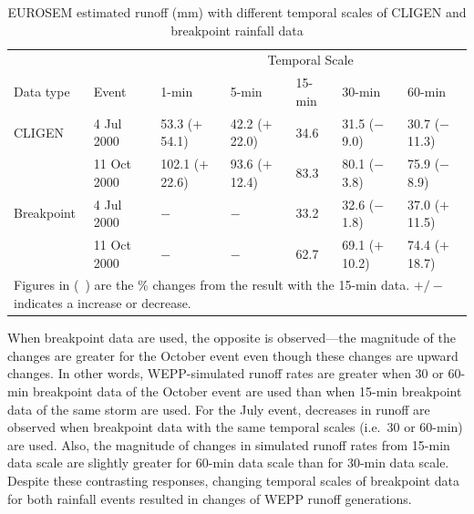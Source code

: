 \begin{table}[htbp]
  \centering
  \footnotesize
  \caption[EUROSEM estimated runoff (mm) with different temporal scales of
CLIGEN and breakpoint rainfall data]{EUROSEM estimated runoff (mm) with
different temporal scales of CLIGEN and breakpoint rainfall data}
\label{tab:DifferentTemporalScalesOfRainfallDataOnEUROSEMRunoffEstimation}
    \begin{tabular}{lllllll}
      \toprule
      & & \multicolumn{5}{c}{Temporal Scale}\\
      \cmidrule{3-7}
      Data type & Event & 1-min & 5-min & 15-min & 30-min & 60-min \\
      \midrule
      CLIGEN & 4 Jul 2000 & 53.3 ($+$54.1) & 42.2 ($+$22.0) & 34.6 & 31.5
($-$9.0) & 30.7 ($-$11.3) \\
       & 11 Oct 2000 & 102.1 ($+$22.6) & 93.6 ($+$12.4) & 83.3 & 80.1 ($-$3.8) &
75.9 ($-$8.9) \\
       \midrule
      Breakpoint & 4 Jul 2000 & $-$ & $-$ & 33.2 & 32.6 ($-$1.8) & 37.0
($+$11.5) \\
       & 11 Oct 2000 & $-$ & $-$ & 62.7 & 69.1 ($+$10.2) & 74.4 ($+$18.7)\\
      \bottomrule
      \multicolumn{7}{p{12cm}}{\footnotesize Figures in (\ ) are the \% changes
from the result with the 15-min data. $+/-$ indicates a increase or decrease.}\\
    \end{tabular}
\end{table}

When breakpoint data are used, the opposite is observed---the magnitude of the
changes are greater for the October event even though these changes are upward
changes. In other words, WEPP-simulated runoff rates are greater when 30 or
60-min breakpoint data of the October event are used than when 15-min
breakpoint data of the same storm are used. For the July event, decreases in
runoff are observed when breakpoint data with the same temporal scales (i.e.\
30 or 60-min) are used. Also, the magnitude of changes in simulated runoff
rates from 15-min data scale are slightly greater for 60-min data scale than for
30-min data scale. Despite these contrasting responses, changing temporal scales
of breakpoint data for both rainfall events resulted in changes of WEPP runoff
generations.

